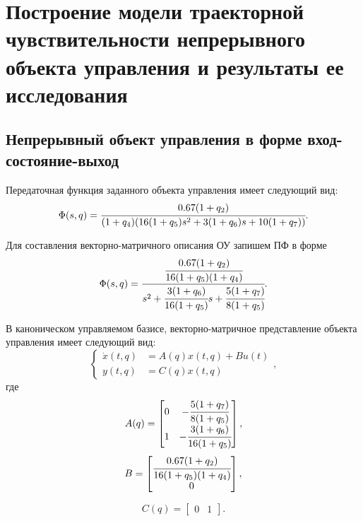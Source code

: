 \section{Построение модели траекторной чувствительности непрерывного объекта управления и результаты ее исследования}\label{problem_1}

\subsection{Непрерывный объект управления в форме вход-состояние-выход}

Передаточная функция заданного объекта управления имеет следующий вид:
\begin{equation}\label{eq_OU}
\Phi (s, q) = \cfrac{0.67(1+q_{2})} {(1+q_{4})(16(1+q_{5})s^{2}+3(1+q_{6})s+10(1+q_{7}))}.
\end{equation}

Для составления векторно-матричного описания ОУ запишем ПФ в форме
\begin{equation*}\label{eq_pf_coc}
\Phi (s, q) = \cfrac{\cfrac{0.67(1+q_{2})} {16(1+q_{5})(1+q_{4})}  } {s^2 + \cfrac{3(1+q_{6})} {16(1+q_{5})} s + \cfrac{5(1+q_{7})} {8(1+q_{5})}}.
\end{equation*}

В каноническом управляемом базисе, векторно-матричное представление объекта управления  имеет следующий вид:
\begin{equation}\label{eq_iso_coc}
\begin{cases}
\dot x(t,q) &= A(q) x(t,q) + B u(t)\\
y(t,q) &= C(q) x(t,q)
\end{cases},
\end{equation}
где
\begin{equation}
	A(q) =
	\begin{bmatrix}
		0 & -\cfrac{5(1+q_{7})} {8(1+q_{5})}\\
	1 & - \cfrac{3(1+q_{6})}  {16(1+q_{5})}
	\end{bmatrix},
\end{equation}
\begin{equation}
	B =
	\begin{bmatrix}
		\cfrac{0.67(1+q_{2})}  {16(1+q_{5})(1+q_{4})}\\
		0
	\end{bmatrix},
\end{equation}

\begin{equation}
	C(q) =
	\begin{bmatrix}
	0& 1
	\end{bmatrix}.
\end{equation}

